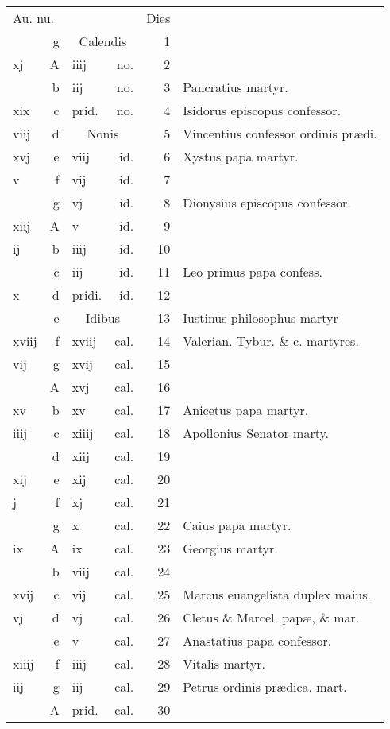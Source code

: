 \documentclass[a5paper,10pt]{book}
\begin{document}
\begin{center}
\begin{tabular}{l r l r r l}
\multicolumn{2}{l}{\color{red}Au. nu.} & & & \color{red} Dies & \\
 & g & \multicolumn{2}{c}{\color{red} Calendis} & 1 & \\
xj & \color{red} A & iiij & no. & 2 & \\
 & b & iij & no. & 3 & Pancratius martyr. \color{black} \\
xix & c & \color{red} prid. & no. & 4 & Isidorus episcopus confessor. \color{black} \\
viij & d & \multicolumn{2}{c}{\color{red} Nonis} & 5 & Vincentius confessor ordinis pr\ae di. \color{black} \\
xvj & e & viij & id. & 6 & Xystus papa martyr. \color{black} \\
v & f & vij & id. & 7 & \\
 & g & vj & id. & 8 & Dionysius episcopus confessor. \color{black} \\
xiij & \color{red} A & v & id. & 9 & \\
ij & b & iiij & id. & 10 & \\
 & c & iij & id. & 11 & Leo primus papa confess. \color{black} \\
x & d & \color{red} pridi. & id. & 12 & \\
 & e & \multicolumn{2}{c}{\color{red} Idibus} & 13 & Iustinus philosophus martyr \\
xviij & f & xviij & cal. & 14 & Valerian. Tybur. \& c. martyres. \\
vij & g & xvij & cal. & 15 & \\
 & \color{red} A & xvj & cal. & 16 & \\
xv & b & xv & cal. & 17 & Anicetus papa martyr. \\
iiij & c & xiiij & cal. & 18 & Apollonius Senator marty. \\
 & d & xiij & cal. & 19 & \\
xij & e & xij & cal. & 20 & \\
j & f & xj & cal. & 21 & \\
 & g & x & cal. & 22 & Caius papa martyr. \\
ix & \color{red} A & ix & cal. & 23 & \color{red} Georgius martyr.\\
 & b & viij & cal. & 24 & \\
xvij & c & vij & cal. & 25 & \color{red} Marcus euangelista duplex maius. \color{black} \\
vj & d & vj & cal. & 26 & Cletus \& Marcel. pap\ae , \& mar. \\
 & e & v & cal. & 27 & Anastatius papa confessor.\\
xiiij & f & iiij & cal. & 28 & Vitalis martyr.\\
iij & g & iij & cal. & 29 & Petrus ordinis pr\ae dica. mart. \\
 & \color{red} A & \color{red} prid. & cal. & 30 & \\

\end{tabular}
\end{center}
\end{document}
